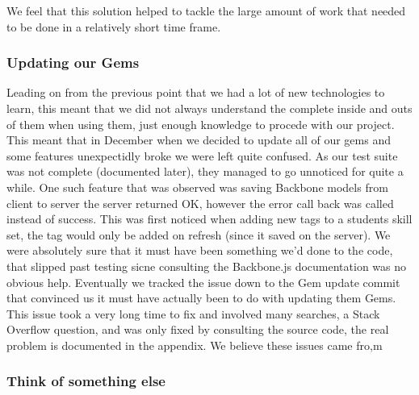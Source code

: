     We feel that this solution helped to tackle the large amount of work that needed to be done in a relatively short time frame.
  \subsubsection{Updating our Gems}
    Leading on from the previous point that we had a lot of new technologies to learn, this meant that we did not always understand the complete inside and outs of them when using them, just enough knowledge to procede with our project. This meant that in December when we decided to update all of our gems and some features unexpectidly broke we were left quite confused. As our test suite was not complete (documented later), they managed to go unnoticed for quite a while.
    One such feature that was observed was saving Backbone models from client to server the server returned OK, however the error call back was called instead of success. This was first noticed when adding new tags to a students skill set, the tag would only be added on refresh (since it saved on the server).
    We were absolutely sure that it must have been something we'd done to the code, that slipped past testing sicne consulting the Backbone.js documentation was no obvious help. Eventually we tracked the issue down to the Gem update commit that convinced us it must have actually been to do with updating them Gems.
    This issue took a very long time to fix and involved many searches, a Stack Overflow question, and was only fixed by consulting the source code, the real problem is documented in the appendix.
    We believe these issues came fro,m
  \subsubsection{Think of something else}
